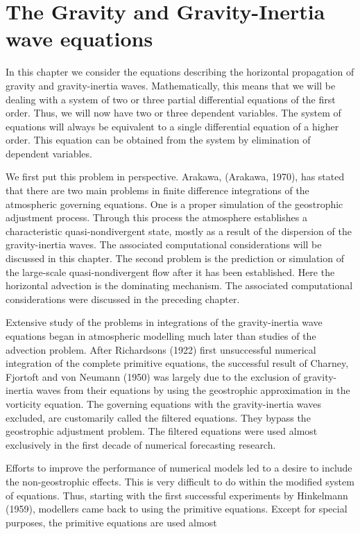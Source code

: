 \chapter{The Gravity and Gravity-Inertia wave equations}\label{Chapter4}

In this chapter we consider the equations describing the horizontal
propagation of gravity and gravity-inertia waves. Mathematically, this
means that we will be dealing with a system of two or three partial
differential equations of the first order. Thus, we will now have two
or three dependent variables. The system of equations will always be
equivalent to a single differential equation of a higher order. This
equation can be obtained from the system by elimination of dependent
variables.

We first put this problem in perspective. Arakawa, (Arakawa, 1970), has
stated that there are two main problems in finite difference
integrations of the atmospheric governing equations. One is a proper
simulation of the geostrophic adjustment process. Through this process
the atmosphere establishes a characteristic quasi-nondivergent state,
mostly as a result of the dispersion of the gravity-inertia waves. The
associated computational considerations will be discussed in this
chapter. The second problem is the prediction or simulation of the
large-scale quasi-nondivergent flow after it has been established. Here
the horizontal advection is the dominating mechanism. The associated
computational considerations were discussed in the preceding chapter.

Extensive study of the problems in integrations of the gravity-inertia
wave equations began in atmospheric modelling much later than studies of
the advection problem. After Richardson\textquotesingle s (1922) first
unsuccessful numerical integration of the complete primitive equations,
the successful result of Charney, Fjortoft and von Neumann (1950) was
largely due to the exclusion of gravity-inertia waves from their
equations by using the geostrophic approximation in the vorticity
equation. The governing equations with the gravity-inertia waves
excluded, are customarily called the filtered equations. They bypass the
geostrophic adjustment problem. The filtered equations were used almost
exclusively in the first decade of numerical forecasting research.

Efforts to improve the performance of numerical models led to a desire
to include the non-geostrophic effects. This is very difficult to do
within the modified system of equations. Thus, starting with the first
successful experiments by Hinkelmann (1959), modellers came back to
using the primitive equations. Except for special purposes, the
primitive equations are used almost

